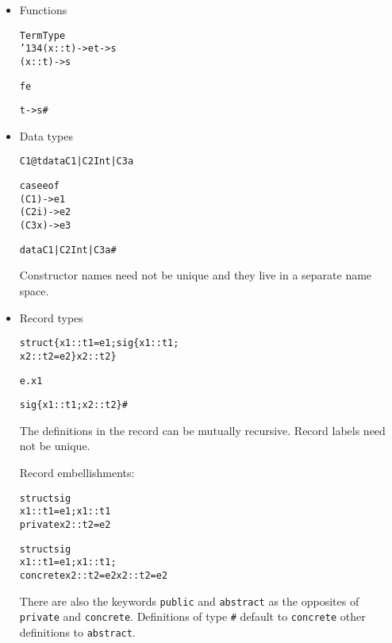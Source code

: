 \documentclass[17pt]{foils} %
\newcommand\bs{\char '134}  %
\begin{document}
\begin{itemize}
\item Functions
\begin{alltt}
Term                       Type
\bs (x::t) -> e              t -> s
                           (x::t) -> s

f e

t -> s                     #

\end{alltt}
\item Data types
\begin{alltt}
C1@t                       data C1 | C2 Int | C3 a

case e of
(C1)   -> e1
(C2 i) -> e2
(C3 x) -> e3

data C1 | C2 Int | C3 a    #

\end{alltt}
Constructor names need not be unique and they live in
a separate name space.

\newpage
\item Record types
\begin{alltt}
struct \{ x1 :: t1 = e1;     sig \{ x1 :: t1;
         x2 :: t2 = e2 \}          x2 :: t2 \}

e.x1

sig \{ x1 :: t1; x2 :: t2 \} #

\end{alltt}
The definitions in the record can be mutually recursive.
Record labels need not be unique.

Record embellishments:
\begin{alltt}
struct                     sig
  x1 :: t1 = e1;             x1 :: t1
  private x2 :: t2 = e2


\end{alltt}
\begin{alltt}
struct                     sig
  x1 :: t1 = e1;             x1 :: t1;
  concrete x2 :: t2 = e2     x2 :: t2 = e2


\end{alltt}
There are also the keywords {\tt public} and {\tt abstract}
as the opposites of {\tt private} and {\tt concrete}.
Definitions of type {\tt \#} default to {\tt concrete}
other definitions to {\tt abstract}.

\end{itemize}
\end{document}
